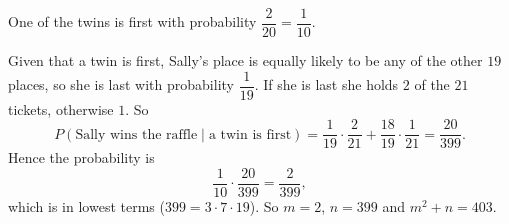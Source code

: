 One of the twins is first with probability $\dfrac{2}{20}=\dfrac{1}{10}$.

Given that a twin is first, Sally's place is equally likely to be any of the other $19$ places, so she is last with probability $\dfrac{1}{19}$. If she is last she holds $2$ of the $21$ tickets, otherwise $1$. So
\[P(\text{Sally wins the raffle}\mid\text{a twin is first})=\dfrac{1}{19}\cdot\dfrac{2}{21}+\dfrac{18}{19}\cdot\dfrac{1}{21}=\dfrac{20}{399}.\]
Hence the probability is
\[\dfrac{1}{10}\cdot\dfrac{20}{399}=\dfrac{2}{399},\]
which is in lowest terms ($399=3\cdot7\cdot19$). So $m=2$, $n=399$ and $m^2+n=\boxed{403}$.
